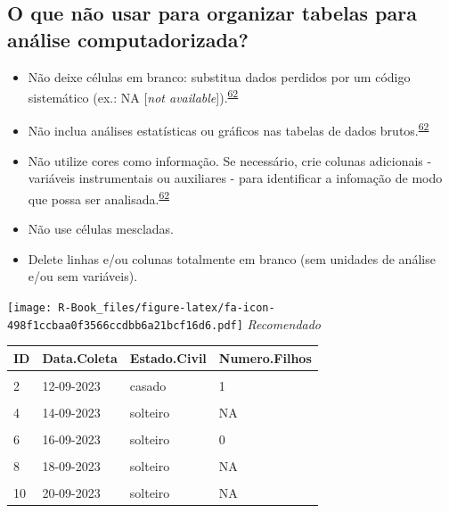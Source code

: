 \documentclass[
]{book}
\begin{document}
\hypertarget{o-que-nuxe3o-usar-para-organizar-tabelas-para-anuxe1lise-computadorizada}{%
\subsection{O que não usar para organizar tabelas para análise computadorizada?}\label{o-que-nuxe3o-usar-para-organizar-tabelas-para-anuxe1lise-computadorizada}}

\begin{itemize}
\item
  Não deixe células em branco: substitua dados perdidos por um código sistemático (ex.: NA {[}\emph{not available}{]}).\textsuperscript{\protect\hyperlink{ref-broman2018}{62}}
\item
  Não inclua análises estatísticas ou gráficos nas tabelas de dados brutos.\textsuperscript{\protect\hyperlink{ref-broman2018}{62}}
\item
  Não utilize cores como informação. Se necessário, crie colunas adicionais - variáveis instrumentais ou auxiliares - para identificar a infomação de modo que possa ser analisada.\textsuperscript{\protect\hyperlink{ref-broman2018}{62}}
\item
  Não use células mescladas.
\item
  Delete linhas e/ou colunas totalmente em branco (sem unidades de análise e/ou sem variáveis).
\end{itemize}

\texttt{[image: R-Book\_files/figure-latex/fa-icon-498f1ccbaa0f3566ccdbb6a21bcf16d6.pdf]} \emph{Recomendado}

\begin{tabu} to 
\toprule
\textbf{ID} & \textbf{Data.Coleta} & \textbf{Estado.Civil} & \textbf{Numero.Filhos}\\
\midrule
{} &  &  & \\
2 & 12-09-2023 & casado & 1\\
 &  &  & \\
4 & 14-09-2023 & solteiro & NA\\
 &  &  & \\
6 & 16-09-2023 & solteiro & 0\\
 &  &  & \\
8 & 18-09-2023 & solteiro & NA\\
 &  &  & \\
10 & 20-09-2023 & solteiro & NA\\
\bottomrule
\end{tabu}
\end{document}
